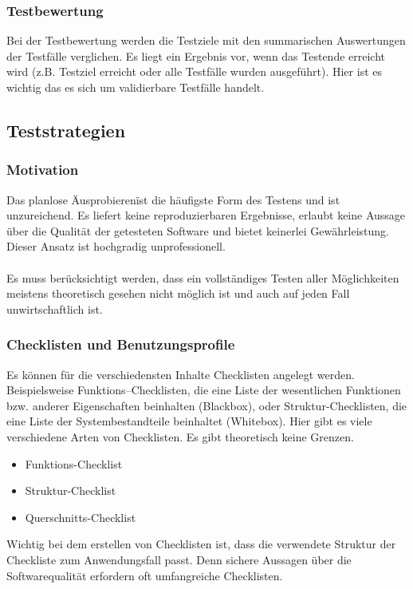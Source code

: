 \subsubsection{Testbewertung}
Bei der Testbewertung werden die Testziele mit den summarischen Auswertungen der Testfälle verglichen. Es liegt ein Ergebnis vor, wenn das Testende erreicht wird (z.B. Testziel erreicht oder alle Testfälle wurden ausgeführt). Hier ist es wichtig das es sich um validierbare Testfälle handelt. 

\subsection{Teststrategien}
\subsubsection{Motivation}
Das planlose \"Ausprobieren\" ist die häufigste Form des Testens und ist unzureichend. Es liefert keine reproduzierbaren Ergebnisse, erlaubt keine Aussage über die Qualität der getesteten Software und bietet keinerlei Gewährleistung. Dieser Ansatz ist hochgradig unprofessionell. 
\\\\
Es muss berücksichtigt werden, dass ein vollständiges Testen aller Möglichkeiten meistens theoretisch gesehen nicht möglich ist und auch auf jeden Fall unwirtschaftlich ist.

\subsubsection{Checklisten und Benutzungsprofile}
Es können für die verschiedensten Inhalte Checklisten angelegt werden. Beispielsweise Funktions--Checklisten, die eine Liste der wesentlichen Funktionen bzw. anderer Eigenschaften beinhalten (Blackbox), oder Struktur-Checklisten, die eine Liste der Systembestandteile beinhaltet (Whitebox). Hier gibt es viele verschiedene Arten von  Checklisten. Es gibt theoretisch keine Grenzen.

\begin{itemize}
\item Funktions-Checklist
\item Struktur-Checklist
\item Querschnitts-Checklist
\end{itemize}

Wichtig bei dem erstellen von Checklisten ist, dass die verwendete Struktur der Checkliste zum Anwendungsfall passt. Denn sichere Aussagen über die Softwarequalität erfordern oft umfangreiche Checklisten.

